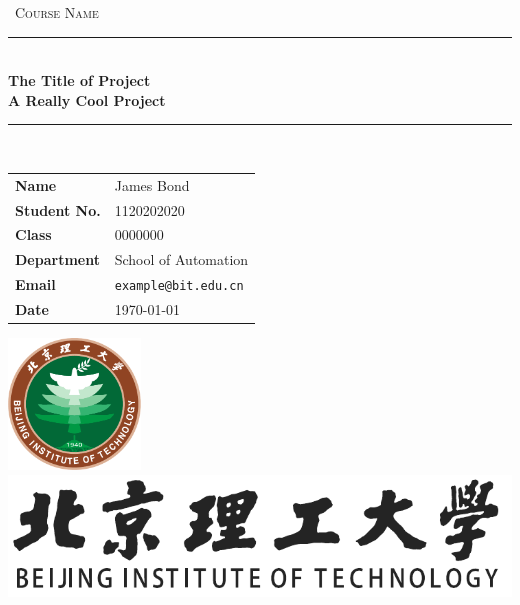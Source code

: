 \documentclass[12pt,english, openany]{book}
\begin{document}

\begin{titlepage}
	\clearpage\thispagestyle{empty}
	\centering
	\vspace{1cm}

	{\
		\textsc{Course Name}
	}
		\vspace{2.5cm}
		
	\rule{\linewidth}{2mm} \\[0.5cm]
	{ \Huge \bfseries The Title of Project\\[0.2em]
		A Really Cool Project}\\[0.5cm]
	\rule{\linewidth}{0.6mm} \\[3.4cm]

	\hspace{2cm}
		\begin{tabular}{l p{5cm}}
		\textbf{Name} & James Bond \\[10pt]
		\textbf{Student No.} & 1120202020 \\[10pt]
		\textbf{Class} & 0000000 \\[10pt]
		\textbf{Department} & School of Automation \\[10pt]
		\textbf{Email} & \texttt{example@bit.edu.cn} \\[10pt]
		\textbf{Date} & \today \\            
		\end{tabular}
   
    
    \vfill
    \centering \includegraphics[height=3.5cm]{bit_logo.pdf}\\ %
    \centering \includegraphics[scale=0.4]{logo_slogan.pdf}
    \vspace{0.5cm}

		
	
	
	\pagebreak

\end{titlepage}
\end{document}
